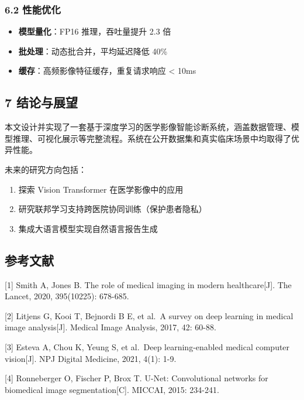 \documentclass{harryopo-mathnotes}
\begin{document}
\subsubsection{6.2 性能优化}\label{ux6027ux80fdux4f18ux5316}

\begin{itemize}
\tightlist
\item
  \textbf{模型量化}：FP16 推理，吞吐量提升 2.3 倍
\item
  \textbf{批处理}：动态批合并，平均延迟降低 40\%
\item
  \textbf{缓存}：高频影像特征缓存，重复请求响应 \textless{} 10ms
\end{itemize}

\subsection{7 结论与展望}\label{ux7ed3ux8bbaux4e0eux5c55ux671b}

本文设计并实现了一套基于深度学习的医学影像智能诊断系统，涵盖数据管理、模型推理、可视化展示等完整流程。系统在公开数据集和真实临床场景中均取得了优异性能。

未来的研究方向包括：

\begin{enumerate}
\def\labelenumi{\arabic{enumi}.}
\tightlist
\item
  探索 Vision Transformer 在医学影像中的应用
\item
  研究联邦学习支持跨医院协同训练（保护患者隐私）
\item
  集成大语言模型实现自然语言报告生成
\end{enumerate}

\subsection{参考文献}\label{ux53c2ux8003ux6587ux732e}

{[}1{]} Smith A, Jones B. The role of medical imaging in modern
healthcare{[}J{]}. The Lancet, 2020, 395(10225): 678-685.

{[}2{]} Litjens G, Kooi T, Bejnordi B E, et al.~A survey on deep
learning in medical image analysis{[}J{]}. Medical Image Analysis, 2017,
42: 60-88.

{[}3{]} Esteva A, Chou K, Yeung S, et al.~Deep learning-enabled medical
computer vision{[}J{]}. NPJ Digital Medicine, 2021, 4(1): 1-9.

{[}4{]} Ronneberger O, Fischer P, Brox T. U-Net: Convolutional networks
for biomedical image segmentation{[}C{]}. MICCAI, 2015: 234-241.
\end{document}
